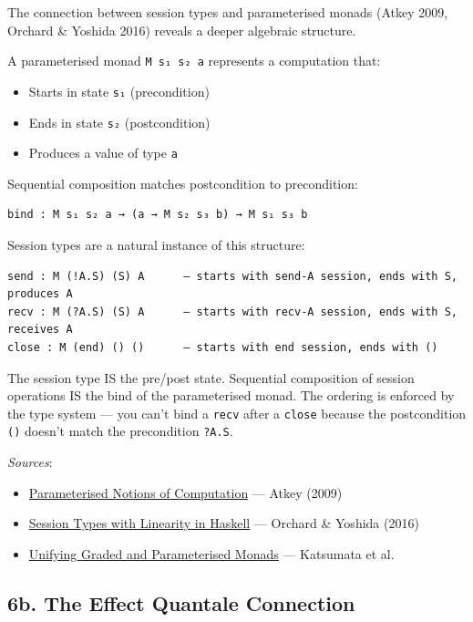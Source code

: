 \documentclass[11pt]{article}
\begin{document}
The connection between session types and parameterised monads (Atkey 2009,
Orchard \& Yoshida 2016) reveals a deeper algebraic structure.

A parameterised monad \texttt{M s₁ s₂ a} represents a computation that:
\begin{itemize}
\item Starts in state \texttt{s₁} (precondition)
\item Ends in state \texttt{s₂} (postcondition)
\item Produces a value of type \texttt{a}
\end{itemize}

Sequential composition matches postcondition to precondition:
\begin{verbatim}
bind : M s₁ s₂ a → (a → M s₂ s₃ b) → M s₁ s₃ b
\end{verbatim}

Session types are a natural instance of this structure:
\begin{verbatim}
send : M (!A.S) (S) A      — starts with send-A session, ends with S, produces A
recv : M (?A.S) (S) A      — starts with recv-A session, ends with S, receives A
close : M (end) () ()      — starts with end session, ends with ()
\end{verbatim}

The session type IS the pre/post state. Sequential composition of session
operations IS the bind of the parameterised monad. The ordering is enforced
by the type system — you can't bind a \texttt{recv} after a \texttt{close} because the
postcondition \texttt{()} doesn't match the precondition \texttt{?A.S}.

\emph{Sources}:
\begin{itemize}
\item \href{https://www.researchgate.net/publication/220676480\_Parameterised\_notions\_of\_computation}{Parameterised Notions of Computation} — Atkey (2009)
\item \href{https://kar.kent.ac.uk/66632/1/RP\_9788793519817C10.pdf}{Session Types with Linearity in Haskell} — Orchard \& Yoshida (2016)
\item \href{https://arxiv.org/pdf/2001.10274}{Unifying Graded and Parameterised Monads} — Katsumata et al.
\end{itemize}
\subsection{6b. The Effect Quantale Connection}
\label{sec:org856adfa}
\end{document}

